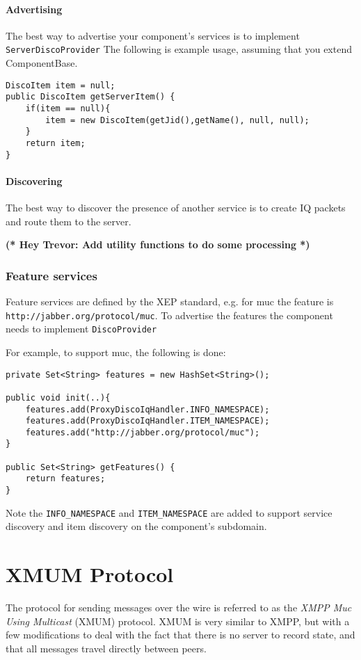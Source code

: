 \documentclass{article}
\newcommand{\todocomment}[2]{{\bf\sc (* Hey #1: #2 *) }}
\newcommand{\code}[1]{\texttt{#1}}
\begin{document}
\paragraph{Advertising}

The best way to advertise your component's services is to implement \code{ServerDiscoProvider}
The following is example usage, assuming that you extend ComponentBase. 
\begin{verbatim}
DiscoItem item = null;
public DiscoItem getServerItem() {
    if(item == null){
        item = new DiscoItem(getJid(),getName(), null, null);
    }
    return item;
}
\end{verbatim}


\paragraph{Discovering}
The best way to discover the presence of another service is to create IQ packets and route them to the server. 

\todocomment{Trevor}{Add utility functions to do some processing}
\subsubsection{Feature services}
Feature services are defined by the XEP standard, e.g. for muc the feature is \code{http://jabber.org/protocol/muc}. To advertise the features the component needs to implement \code{DiscoProvider}

For example, to support muc, the following is done:
\begin{verbatim}
private Set<String> features = new HashSet<String>();

public void init(..){
    features.add(ProxyDiscoIqHandler.INFO_NAMESPACE);
    features.add(ProxyDiscoIqHandler.ITEM_NAMESPACE);
    features.add("http://jabber.org/protocol/muc");
}

public Set<String> getFeatures() {
    return features;
}
\end{verbatim}

Note the \code{INFO\_NAMESPACE} and \code{ITEM\_NAMESPACE} are added to support service discovery and item discovery on the component's subdomain.
\section{XMUM Protocol}
The protocol for sending messages over the wire is referred to as the
\textit{XMPP Muc Using Multicast} (XMUM) protocol.  XMUM is very similar to
XMPP, but with a few modifications to deal with the fact that there is no
server to record state, and that all messages travel directly between peers. 
\end{document}
